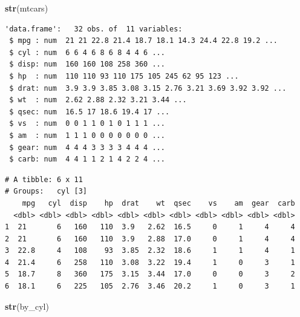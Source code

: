\documentclass[]{book}
\newenvironment{Shaded}{\begin{snugshade}}{\end{snugshade}}
\newcommand{\KeywordTok}[1]{\textcolor[rgb]{0.13,0.29,0.53}{\textbf{#1}}}
\newcommand{\NormalTok}[1]{#1}
\newcommand{\OperatorTok}[1]{\textcolor[rgb]{0.81,0.36,0.00}{\textbf{#1}}}
\newcommand{\StringTok}[1]{\textcolor[rgb]{0.31,0.60,0.02}{#1}}
\theoremstyle{definition}
\theoremstyle{definition}
\theoremstyle{definition}
\theoremstyle{remark}
\begin{document}
\begin{Shaded}
\begin{Highlighting}[]
\KeywordTok{str}\NormalTok{(mtcars)}
\end{Highlighting}
\end{Shaded}

\begin{verbatim}
'data.frame':   32 obs. of  11 variables:
 $ mpg : num  21 21 22.8 21.4 18.7 18.1 14.3 24.4 22.8 19.2 ...
 $ cyl : num  6 6 4 6 8 6 8 4 4 6 ...
 $ disp: num  160 160 108 258 360 ...
 $ hp  : num  110 110 93 110 175 105 245 62 95 123 ...
 $ drat: num  3.9 3.9 3.85 3.08 3.15 2.76 3.21 3.69 3.92 3.92 ...
 $ wt  : num  2.62 2.88 2.32 3.21 3.44 ...
 $ qsec: num  16.5 17 18.6 19.4 17 ...
 $ vs  : num  0 0 1 1 0 1 0 1 1 1 ...
 $ am  : num  1 1 1 0 0 0 0 0 0 0 ...
 $ gear: num  4 4 4 3 3 3 3 4 4 4 ...
 $ carb: num  4 4 1 1 2 1 4 2 2 4 ...
\end{verbatim}

\begin{Shaded}
\end{Shaded}

\begin{verbatim}
# A tibble: 6 x 11
# Groups:   cyl [3]
    mpg   cyl  disp    hp  drat    wt  qsec    vs    am  gear  carb
  <dbl> <dbl> <dbl> <dbl> <dbl> <dbl> <dbl> <dbl> <dbl> <dbl> <dbl>
1  21       6   160   110  3.9   2.62  16.5     0     1     4     4
2  21       6   160   110  3.9   2.88  17.0     0     1     4     4
3  22.8     4   108    93  3.85  2.32  18.6     1     1     4     1
4  21.4     6   258   110  3.08  3.22  19.4     1     0     3     1
5  18.7     8   360   175  3.15  3.44  17.0     0     0     3     2
6  18.1     6   225   105  2.76  3.46  20.2     1     0     3     1
\end{verbatim}

\begin{Shaded}
\begin{Highlighting}[]
\KeywordTok{str}\NormalTok{(by_cyl)}
\end{Highlighting}
\end{Shaded}
\end{document}
